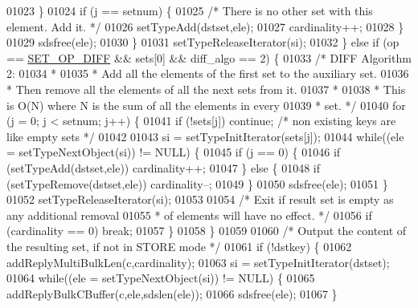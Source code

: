 \begin{DoxyCode}
01023             \}
01024             \textcolor{keywordflow}{if} (j == setnum) \{
01025                 \textcolor{comment}{/* There is no other set with this element. Add it. */}
01026                 setTypeAdd(dstset,ele);
01027                 cardinality++;
01028             \}
01029             sdsfree(ele);
01030         \}
01031         setTypeReleaseIterator(si);
01032     \} \textcolor{keywordflow}{else} \textcolor{keywordflow}{if} (op == \hyperlink{server_8h_ad22703ffec4b7bf6cd262099917dc6a1}{SET\_OP\_DIFF} && sets[0] && diff\_algo == 2) \{
01033         \textcolor{comment}{/* DIFF Algorithm 2:}
01034 \textcolor{comment}{         *}
01035 \textcolor{comment}{         * Add all the elements of the first set to the auxiliary set.}
01036 \textcolor{comment}{         * Then remove all the elements of all the next sets from it.}
01037 \textcolor{comment}{         *}
01038 \textcolor{comment}{         * This is O(N) where N is the sum of all the elements in every}
01039 \textcolor{comment}{         * set. */}
01040         \textcolor{keywordflow}{for} (j = 0; j < setnum; j++) \{
01041             \textcolor{keywordflow}{if} (!sets[j]) \textcolor{keywordflow}{continue}; \textcolor{comment}{/* non existing keys are like empty sets */}
01042 
01043             si = setTypeInitIterator(sets[j]);
01044             \textcolor{keywordflow}{while}((ele = setTypeNextObject(si)) != NULL) \{
01045                 \textcolor{keywordflow}{if} (j == 0) \{
01046                     \textcolor{keywordflow}{if} (setTypeAdd(dstset,ele)) cardinality++;
01047                 \} \textcolor{keywordflow}{else} \{
01048                     \textcolor{keywordflow}{if} (setTypeRemove(dstset,ele)) cardinality--;
01049                 \}
01050                 sdsfree(ele);
01051             \}
01052             setTypeReleaseIterator(si);
01053 
01054             \textcolor{comment}{/* Exit if result set is empty as any additional removal}
01055 \textcolor{comment}{             * of elements will have no effect. */}
01056             \textcolor{keywordflow}{if} (cardinality == 0) \textcolor{keywordflow}{break};
01057         \}
01058     \}
01059 
01060     \textcolor{comment}{/* Output the content of the resulting set, if not in STORE mode */}
01061     \textcolor{keywordflow}{if} (!dstkey) \{
01062         addReplyMultiBulkLen(c,cardinality);
01063         si = setTypeInitIterator(dstset);
01064         \textcolor{keywordflow}{while}((ele = setTypeNextObject(si)) != NULL) \{
01065             addReplyBulkCBuffer(c,ele,sdslen(ele));
01066             sdsfree(ele);
01067         \}

\end{DoxyCode}

